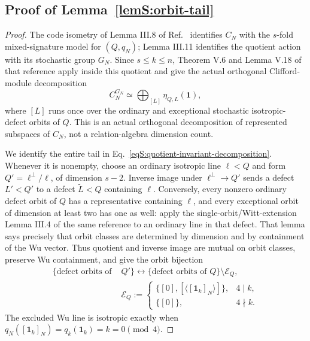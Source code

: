 \documentclass[journal,twocolumn]{IEEEtran}
\theoremstyle{definition}
\theoremstyle{plain}
\newcommand{\one}{\bm 1}
\begin{document}
\subsection{Proof of Lemma~\ref{lemS:orbit-tail}}
\label{app:proof-orbit-tail}

\begin{proof}
The code isometry of Lemma III.8 of
Ref.~\cite{MontealegreGross2025} identifies $C_N$ with the $s$-fold
mixed-signature model for $(Q,q_N)$; Lemma III.11 identifies the quotient
action with its stochastic group $G_N$.  Since $s\leq k\leq n$, Theorem
V.6 and Lemma V.18 of that reference apply inside this quotient and give
the actual orthogonal Clifford-module decomposition
\begin{equation}
 C_N^{G_N}\simeq
 \bigoplus_{[L]}\eta_{Q,L}(\bm1),
 \label{eqS:quotient-invariant-decomposition}
\end{equation}
where $[L]$ runs once over the ordinary and exceptional stochastic
isotropic-defect orbits of $Q$.  This is an actual orthogonal decomposition
of represented subspaces of $C_N$, not a relation-algebra dimension count.

We identify the entire tail in Eq.~\eqref{eqS:quotient-invariant-decomposition}.
Whenever it is nonempty, choose an ordinary isotropic line
$\ell<Q$ and form $Q'=\ell^\perp/\ell$, of dimension $s-2$.
Inverse image under $\ell^\perp\to Q'$ sends a defect $L'<Q'$ to a
defect $\widetilde L<Q$ containing $\ell$.  Conversely, every nonzero
ordinary defect orbit of $Q$ has a representative containing $\ell$, and
every exceptional orbit of dimension at least two has one as well:
apply the single-orbit/Witt-extension Lemma III.4 of the same reference
to an ordinary line in that defect.  That lemma says precisely that orbit
classes are determined by dimension and by containment of the Wu vector.
Thus quotient and inverse image are mutual on orbit classes, preserve Wu
containment, and give the
orbit bijection
\begin{equation}
 \begin{aligned}
 \{\text{defect orbits of }&Q'\} \longleftrightarrow\{\text{defect orbits of }Q\}
   \setminus\mathcal E_Q,\\
 &\mathcal E_Q:=\begin{cases}
 \{[0],[\langle[\one_k]_N\rangle]\},&4\mid k,\\
 \{[0]\},&4\nmid k.
 \end{cases}
 \end{aligned}
 \label{eqS:defect-orbit-tail-bijection}
\end{equation}
The excluded Wu line is isotropic exactly when
$q_N([\one_k]_N)=q_k(\one_k)=k=0\pmod4$.


\end{proof}
\end{document}
